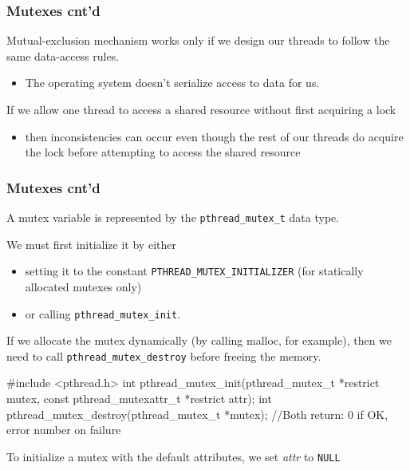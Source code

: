 \documentclass[newPxFont,sthlmFooter,nooffset]{beamer}
\begin{document}
\begin{frame}[t]
  \frametitle{Mutexes cnt'd}
Mutual-exclusion mechanism works only if we design our threads to follow the same data-access rules.
\begin{itemize}
\item The operating system doesn’t serialize access to data for us.
\end{itemize}

If we allow one thread to access a shared resource without first
  acquiring a lock
  \begin{itemize}
  \item then inconsistencies can occur even though the rest of our
    threads do acquire the lock before attempting to access the shared
    resource
  \end{itemize}
\end{frame}


\begin{frame}[fragile,t]
  \frametitle{Mutexes cnt'd}
A mutex variable is represented by the \texttt{pthread\_mutex\_t} data type.

We must first initialize it by either
\begin{itemize}
\item setting it to the constant \texttt{PTHREAD\_MUTEX\_INITIALIZER}
  (for statically allocated mutexes only)
\item or calling \texttt{pthread\_mutex\_init}.
\end{itemize}

If we allocate the mutex dynamically (by calling malloc, for example),
then we need to call \texttt{pthread\_mutex\_destroy} before freeing the memory.

\begin{codedef}
#include <pthread.h>
int pthread_mutex_init(pthread_mutex_t *restrict mutex,
                       const pthread_mutexattr_t *restrict attr);
int pthread_mutex_destroy(pthread_mutex_t *mutex);
//Both return: 0 if OK, error number on failure
\end{codedef}

To initialize a mutex with the default attributes, we set \textit{attr} to \texttt{NULL}
\end{frame}
\end{document}
